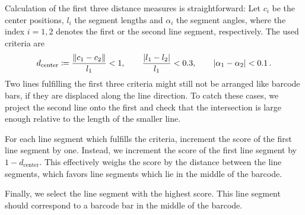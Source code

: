 Calculation of the first three distance measures is straightforward: Let $c_i$
be the center positions, $l_i$ the segment lengths and $\alpha_i$ the segment angles, where the index $i=1,2$
denotes the first or the second line segment, respectively. The used criteria are
\begin{equation*}
d_{\text{center}}\coloneqq\frac{\lVert c_1-c_2\rVert}{l_1}<1,\qquad \frac{\lvert l_1-l_2\rvert}{l_1}<0.3,\qquad \lvert\alpha_1-\alpha_2\rvert<0.1\,.
\end{equation*}
Two lines fulfilling the first three criteria might still not be arranged like
barcode bars, if they are displaced along the line direction. To catch these
cases, we project the second line onto the first and check that the intersection
is large enough relative to the length of the smaller line.

For each line segment which fulfills the criteria, \citeauthor{Creusot2016}
increment the score of the first line segment by one. Instead, we increment the score of the
first line segment by $1-d_{\text{center}}$. This effectively weighs the score by the distance
between the line segments, which favors line segments which lie in
the middle of the barcode.

Finally, we select the line segment with the highest score. This line segment
should correspond to a barcode bar in the middle of the barcode.

